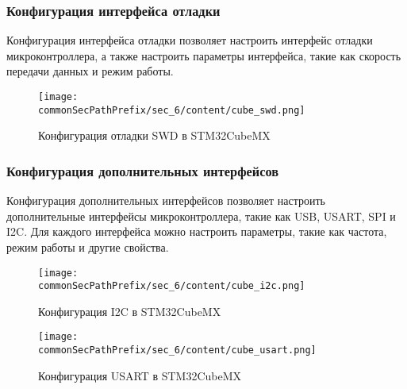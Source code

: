 \subsubsection{Конфигурация интерфейса отладки}
Конфигурация интерфейса отладки позволяет настроить интерфейс отладки микроконтроллера, а также настроить параметры интерфейса, такие как скорость передачи данных и режим работы. 
\begin{figure}[h!]
    \centering
    \texttt{[image: \\commonSecPathPrefix/sec\_6/content/cube\_swd.png]}
    \caption{Конфигурация отладки SWD в STM32CubeMX}
\end{figure}

\subsubsection{Конфигурация дополнительных интерфейсов}
Конфигурация дополнительных интерфейсов позволяет настроить дополнительные интерфейсы микроконтроллера, такие как USB, USART, SPI и I2C. Для каждого интерфейса можно настроить параметры, такие как частота, режим работы и другие свойства.
\begin{figure}[h!]
    \centering
    \texttt{[image: \\commonSecPathPrefix/sec\_6/content/cube\_i2c.png]}
    \caption{Конфигурация I2C в STM32CubeMX}
\end{figure}
\begin{figure}[h!]
    \centering
    \texttt{[image: \\commonSecPathPrefix/sec\_6/content/cube\_usart.png]}
    \caption{Конфигурация USART в STM32CubeMX}
\end{figure}